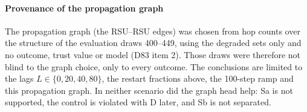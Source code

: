 \paragraph*{Provenance of the propagation graph}
The propagation graph (the RSU--RSU edges) was chosen from hop counts over the structure of the evaluation draws 400--449, using the degraded sets only and no outcome, trust value or model (D83 item 2).
Those draws were therefore not blind to the graph choice, only to every outcome.
The conclusions are limited to the lags $L\in\{0,20,40,80\}$, the restart fractions above, the 100-step ramp and this propagation graph.
In neither scenario did the graph head help: Sa is not supported, the control is violated with D later, and Sb is not separated.
